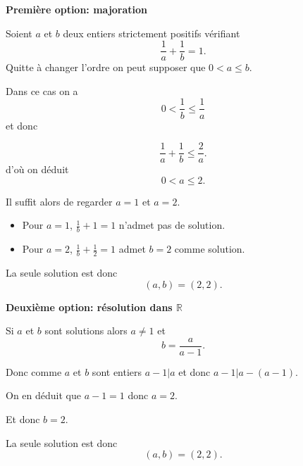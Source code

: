 \begin{sol}

  \textbf{Première option: majoration}

  Soient $a$ et $b$ deux entiers strictement positifs vérifiant
  \[\frac{1}{a} + \frac{1}{b} = 1.\]
  Quitte à changer l'ordre on peut supposer que $0 < a \leq b$.

  Dans ce cas on a
  \[0 < \frac{1}{b} \leq \frac{1}{a}\]
  et donc

  \[\frac{1}{a} + \frac{1}{b} \leq \frac{2}{a}.\]
  d'où on déduit
  \[0 < a \leq 2.\]

  Il suffit alors de regarder $a = 1$ et $a=2$.

  \begin{itemize}
    \item Pour $a=1$, $\frac{1}{b} + 1 = 1$ n'admet pas de solution.
    \item Pour $a=2$, $\frac{1}{b} + \frac{1}{2} = 1$ admet $b=2$ comme solution.
  \end{itemize}

  La seule solution est donc
  \[\boxed{(a,b) = (2,2).}\]

  \textbf{Deuxième option: résolution dans $\mathbb{R}$}

  Si $a$ et $b$ sont solutions alors $a \neq 1$ et
  \[b = \frac{a}{a-1}.\]

  Donc comme $a$ et $b$ sont entiers $a-1 | a$ et donc $a-1| a-(a-1)$.

  On en déduit que $a-1 = 1$ donc $a=2$.

  Et donc $b=2$.

  La seule solution est donc
  \[\boxed{(a,b) = (2,2).}\]

\end{sol}

